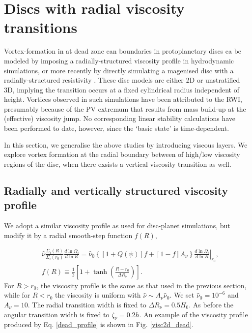 \section{Discs with radial viscosity transitions}\label{dead}
Vortex-formation in at dead zone can boundaries in protoplanetary
discs ca be modeled by imposing a radially-structured viscosity
profile \citep{varniere06,crespe11} in  hydrodynamic simulations, or
more recently by directly simulating a magenised disc with a
radially-structured resistivity \citep{lyra12}. These disc models are
either 2D or unstratified 3D,  implying the transition occurs at a
fixed cylindrical radius independent of height. Vortices observed in
such simulations have been attributed to the RWI, presumably because
of the PV extremum that results from mass build-up at the (effective)
viscosity jump. No corresponding linear stability
calculations have been performed to date, however, since the `basic
state' is time-dependent.       

In this section, we generalise the above studies by  
introducing viscous layers. We explore vortex formation at the
radial boundary between of high/low viscosity regions of the disc, 
when there exsists a vertical viscosity transition as well.     

\subsection{Radially and vertically structured viscosity profile}
We adopt a similar viscosity profile as used for disc-planet
simulations, but modify it by a radial smooth-step function $f(R)$, 

\begin{align}\label{dead_profile}
  &\hat{\nu}\frac{\Sigma_i(R)}{\Sigma_i(r_0)}\frac{d\ln{\Omega_i}}{d\ln{R}} = 
  \hat{\nu}_0\left\{ \left[1+Q(\psi)\right]f + \left[ 1-
    f\right]A_\nu\right\}%
  \left.\frac{d\ln{\Omega_i}}{d\ln{R}}\right|_{r_0},\\
  &f(R) \equiv \frac{1}{2}\left[ 1 + \tanh{\left(\frac{R-r_0}{\Delta R_\nu}\right)} \right].
\end{align}
For $R>r_0$, the viscosity profile is the same as that used in the
previous section, while for $R<r_0$ the viscosity is uniform with 
$\hat{\nu}\sim A_\nu\hat{\nu}_0$. We set $\hat{\nu}_0=10^{-6}$ and
$A_\nu=10$. The radial transition width is fixed to $\Delta R_\nu =
0.5H_0$. As before the angular transition width is fixed to
$\zeta_\nu=0.2h$. An example of the viscosity profile produced by
Eq. \ref{dead_profile} is shown in Fig. \ref{visc2d_dead}.   

